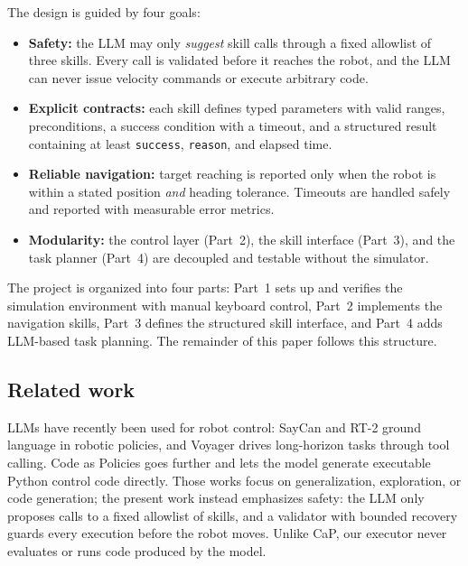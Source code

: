 \documentclass[conference]{IEEEtran}
\begin{document}
The design is guided by four goals:
\begin{itemize}
  \item \textbf{Safety:} the LLM may only \emph{suggest} skill calls through
        a fixed allowlist of three skills. Every call is validated before it
        reaches the robot, and the LLM can never issue velocity commands or
        execute arbitrary code.
  \item \textbf{Explicit contracts:} each skill defines typed parameters with
        valid ranges, preconditions, a success condition with a timeout, and
        a structured result containing at least \texttt{success}, \texttt{reason},
        and elapsed time.
  \item \textbf{Reliable navigation:} target reaching is reported only when the
        robot is within a stated position \emph{and} heading tolerance. Timeouts
        are handled safely and reported with measurable error metrics.
  \item \textbf{Modularity:} the control layer (Part~2), the skill interface
        (Part~3), and the task planner (Part~4) are decoupled and testable
        without the simulator.
\end{itemize}

The project is organized into four parts: Part~1 sets up and verifies the
simulation environment with manual keyboard control, Part~2 implements the
navigation skills, Part~3 defines the structured skill interface, and Part~4
adds LLM-based task planning. The remainder of this paper follows this
structure.

\subsection*{Related work}
LLMs have recently been used for robot control: SayCan \cite{saycan} and
RT-2 \cite{rt2} ground language in robotic policies, and Voyager
\cite{voyager} drives long-horizon tasks through tool calling. Code as
Policies \cite{cap} goes further and lets the model generate executable
Python control code directly. Those works focus on generalization,
exploration, or code generation; the present work instead emphasizes
safety: the LLM only proposes calls to a fixed allowlist of skills, and a
validator with bounded recovery guards every execution before the robot
moves. Unlike CaP, our executor never evaluates or runs code produced by
the model.

\end{document}
